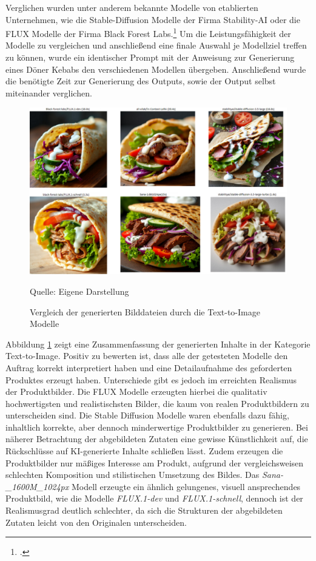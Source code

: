 Verglichen wurden unter anderem bekannte Modelle von etablierten Unternehmen, wie die Stable-Diffusion Modelle der Firma Stability-AI oder die FLUX Modelle der Firma Black Forest Labs.\footcite{stabilityai,blackforestlabs}
Um die Leistungsfähigkeit der Modelle zu vergleichen und anschließend eine finale Auswahl je Modellziel treffen zu können, wurde ein identischer Prompt mit der Anweisung zur Generierung eines Döner Kebabs den verschiedenen Modellen übergeben.
Anschließend wurde die benötigte Zeit zur Generierung des Outputs, sowie der Output selbst miteinander verglichen.

\begin{figure}[h]
    \centering
    \includegraphics[width=\textwidth]{abbildungen/Results_image_generation}
    \caption{Vergleich der generierten Bilddateien durch die Text-to-Image Modelle}
    \label{fig:results_image_generation}
    \vspace{0.5cm}
    \raggedright Quelle: Eigene Darstellung
\end{figure}

Abbildung \ref{fig:results_image_generation} zeigt eine Zusammenfassung der generierten Inhalte in der Kategorie Text-to-Image.
Positiv zu bewerten ist, dass alle der getesteten Modelle den Auftrag korrekt interpretiert haben und eine Detailaufnahme des geforderten Produktes erzeugt haben.
Unterschiede gibt es jedoch im erreichten Realismus der Produktbilder.
Die FLUX Modelle erzeugten hierbei die qualitativ hochwertigsten und realistischsten Bilder, die kaum von realen Produktbildern zu unterscheiden sind.
Die Stable Diffusion Modelle waren ebenfalls dazu fähig, inhaltlich korrekte, aber dennoch minderwertige Produktbilder zu generieren.
Bei näherer Betrachtung der abgebildeten Zutaten eine gewisse Künstlichkeit auf, die Rückschlüsse auf \ac{KI}-generierte Inhalte schließen lässt.
Zudem erzeugen die Produktbilder nur mäßiges Interesse am Produkt, aufgrund der vergleichsweisen schlechten Komposition und stilistischen Umsetzung des Bildes.
Das \textit{Sana-\_1600M\_1024px} Modell erzeugte ein ähnlich gelungenes, visuell ansprechendes Produktbild, wie die Modelle \textit{FLUX.1-dev} und \textit{FLUX.1-schnell}, dennoch ist der Realismusgrad deutlich schlechter, da sich die Strukturen der abgebildeten Zutaten leicht von den Originalen unterscheiden.

